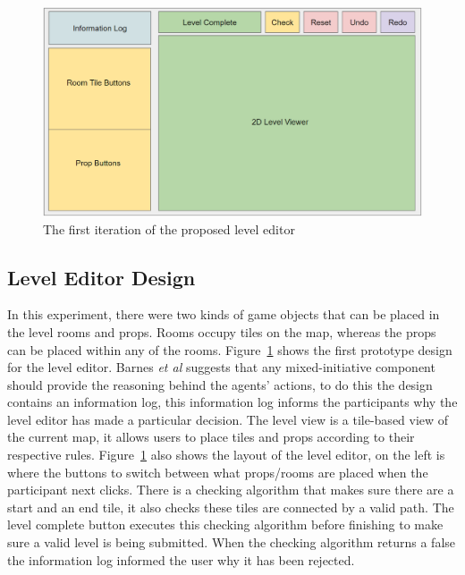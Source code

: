 \documentclass[journal]{IEEEtran}
\begin{document}
\begin{figure}[h]
	\includegraphics[width=1.0\linewidth]{LevelEditorLayout.PNG}
	\caption{The first iteration of the proposed level editor}
	\label{myLevelEditor}
\end{figure} 

\subsection{Level Editor Design}
In this experiment, there were two kinds of game objects that can be placed in the level rooms and props. Rooms occupy tiles on the map, whereas the props can be placed within any of the rooms. Figure~\ref{myLevelEditor} shows the first prototype design for the level editor. Barnes \textit{et al}\cite{barnes2015designing} suggests that any mixed-initiative component should provide the reasoning behind the agents' actions, to do this the design contains an information log, this information log informs the participants why the level editor has made a particular decision. The level view is a tile-based view of the current map, it allows users to place tiles and props according to their respective rules. Figure~\ref{myLevelEditor} also shows the layout of the level editor, on the left is where the buttons to switch between what props/rooms are placed when the participant next clicks. There is a checking algorithm that makes sure there are a start and an end tile, it also checks these tiles are connected by a valid path. The level complete button executes this checking algorithm before finishing to make sure a valid level is being submitted. When the checking algorithm returns a false the information log informed the user why it has been rejected.
\end{document}
